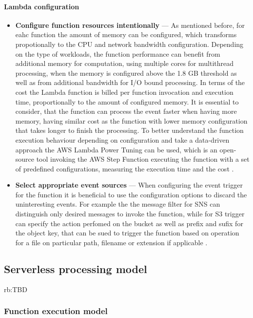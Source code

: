 \paragraph{Lambda configuration}

\begin{itemize}
    \item \textbf{Configure function resources intentionally} --- As mentioned before, for eahc function the amount of memory can be configured, which transforms propotionally to the CPU and network bandwidth configuration. 
    Depending on the type of workloads, the function performance can benefit from additional memory for computation, using multiple cores for multithread processing, when the memory is configured above the 1.8 GB threshold as well as from additional bandwidth for I/O bound processing. 
    In terms of the cost the Lambda function is billed per function invocation and execution time, proportionally to the amount of configured memory. 
    It is essential to consider, that the function can process the event faster when having more memory, having similar cost as the function with lower memory configuration that takes longer to finish the processing.
    To better understand the function execution behaviour depending on configuration and take a data-driven approach the AWS Lambda Power Tuning can be used, which is an open-source tool invoking the AWS Step Function executing the function with a set of predefined configurations, measuring the execution time and the cost \cite{BecomeAServerlessBlackBelt}.
    \item \textbf{Select appropriate event sources} --- When configuring the event trigger for the function it is beneficial to use the configuration options to discard the uninteresting events. For example the the message filter for SNS can distinguish only desired messages to invoke the function, while for S3 trigger can specify the action perfomed on the bucket as well as prefix and sufix for the object key, that can be sued to trigger the function based on operation for a file on particular path, filename or extension if applicable \cite{BecomeAServerlessBlackBelt}. 
\end{itemize}

\subsection{Serverless processing model}

rb:TBD

\subsubsection{Function execution model}

